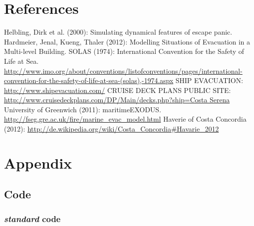 \documentclass[11pt]{article}
\begin{document}
\section{References}
\begin{thebibliography}{9}
 Helbling, Dirk et al. (2000): Simulating dynamical features of escape panic.
 Hardmeier, Jenal, Kueng, Thaler (2012): Modelling Situations of Evacuation in a Multi-level Building.
 SOLAS (1974): International Convention for the Safety of Life at Sea. \url{http://www.imo.org/about/conventions/listofconventions/pages/international-convention-for-the-safety-of-life-at-sea-(solas),-1974.aspx}
 SHIP EVACUATION: \url{http://www.shipevacuation.com/}
 CRUISE DECK PLANS PUBLIC SITE: \url{http://www.cruisedeckplans.com/DP/Main/decks.php?ship=Costa Serena}
 University of Greenwich (2011):  maritimeEXODUS. \url{http://fseg.gre.ac.uk/fire/marine_evac_model.html}
 Haverie of Costa Concordia (2012): \url{http://de.wikipedia.org/wiki/Costa_Concordia#Havarie_2012}
	
\end{thebibliography}

\section{Appendix}

\subsection{Code}



\subsubsection{\textit{standard} code}
\end{document}
